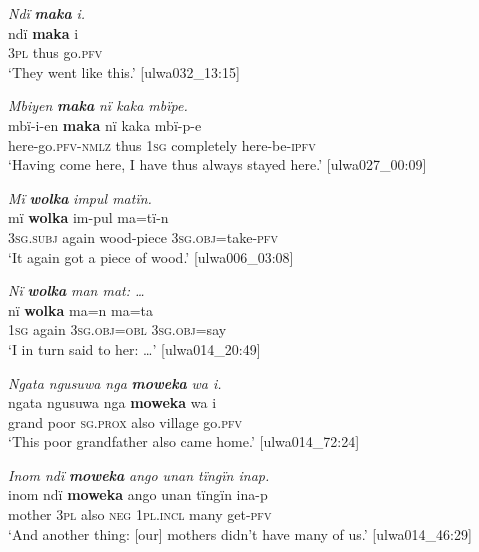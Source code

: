 \ea%
    \label{ex:otherwc:107}
          \textit{Ndï} \textbf{\textit{maka}} \textit{i.}\\
\gll    ndï  \textbf{maka}  i\\
    3\textsc{pl}  thus  go.\textsc{pfv}\\
\glt `They went like this.’ [ulwa032\_13:15]
\z

\ea%
    \label{ex:otherwc:108}
          \textit{Mbiyen} \textbf{\textit{maka}} \textit{nï kaka mbïpe.}\\
\gll    mbï-i-en      \textbf{maka}  nï    kaka      mbï-p-e\\
    here-go.\textsc{pfv-nmlz}  thus  1\textsc{sg}  completely  here-be\textsc{{}-ipfv}\\
\glt `Having come here, I have thus always stayed here.’ [ulwa027\_00:09]
\z

\ea%
    \label{ex:otherwc:109}
          \textit{Mï} \textbf{\textit{wolka}} \textit{impul matïn.}\\
\gll    mï      \textbf{wolka}  {im-pul}      ma=tï-n\\
    3\textsc{sg.subj}  again  wood-piece  3\textsc{sg.obj}=take-\textsc{pfv}\\
\glt `It again got a piece of wood.’ [ulwa006\_03:08]
\z

\ea%
    \label{ex:otherwc:110}
          \textit{Nï} \textbf{\textit{wolka}} \textit{man mat: …}\\
\gll    nï    \textbf{wolka}   ma=n      ma=ta\\
    1\textsc{sg}  again  3\textsc{sg.obj=obl}  3\textsc{sg.obj}=say\\
\glt `I in turn said to her: …’ [ulwa014\_20:49]
\z

\ea%
    \label{ex:otherwc:111}
          \textit{Ngata ngusuwa nga} \textbf{\textit{moweka}} \textit{wa i.}\\
\gll    ngata  ngusuwa  nga      \textbf{moweka}  wa     i\\
    grand  poor    \textsc{sg.prox}  also    village  go.\textsc{pfv}\\
\glt `This poor grandfather also came home.’ [ulwa014\_72:24]
\z

\ea%
    \label{ex:otherwc:112}
          \textit{Inom ndï} \textbf{\textit{moweka}} \textit{ango unan tïngïn inap.}\\
\gll    inom  ndï  \textbf{moweka}  ango  unan    tïngïn  ina-p\\
    mother  3\textsc{pl}  also    \textsc{neg}  \textsc{1pl.incl}  many  get-\textsc{pfv}\\
\glt `And another thing: [our] mothers didn’t have many of us.’ [ulwa014\_46:29]
\z

